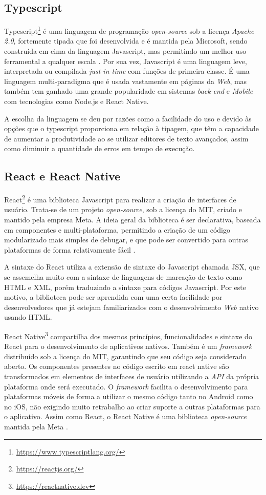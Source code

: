 \subsection{Typescript}

Typescript\footnote{\url{https://www.typescriptlang.org/}} é uma linguagem de programação \textit{open-source} sob a licença \textit{Apache 2.0}, fortemente tipada que foi desenvolvida e é mantida pela Microsoft, sendo construída em cima da linguagem Javascript, mas permitindo um melhor uso ferramental a qualquer escala \cite{typescript}. Por sua vez, Javascript \cite{javascript} é uma linguagem leve, interpretada ou compilada \textit{just-in-time} com funções de primeira classe. É uma linguagem multi-paradigma que é usada vastamente em páginas da \textit{Web}, mas também tem ganhado uma grande popularidade em sistemas \textit{back-end} e \textit{Mobile} com tecnologias como Node.js e React Native.

A escolha da linguagem se deu por razões como a facilidade do uso e devido às opções que o typescript proporciona em relação à tipagem, que têm a capacidade de aumentar a produtividade ao se utilizar editores de texto avançados, assim como diminuir a quantidade de erros em tempo de execução.

\subsection{React e React Native}
\label{react-section}

React\footnote{\url{https://reactjs.org/}} é uma biblioteca Javascript para realizar a criação de interfaces de usuário. Trata-se de um projeto \textit{open-source}, sob a licença do MIT, criado e mantido pela empresa Meta. A ideia geral da biblioteca é ser declarativa, baseada em componentes e multi-plataforma, permitindo a criação de um código modularizado mais simples de debugar, e que pode ser convertido para outras plataformas de forma relativamente fácil \cite{react}.

A sintaxe do React utiliza a extensão de sintaxe do Javascript chamada JSX, que se assemelha muito com a sintaxe de linguagens de marcação de texto como HTML e XML, porém traduzindo a sintaxe para códigos Javascript. Por este motivo, a biblioteca pode ser aprendida com uma certa facilidade por desenvolvedores que já estejam familiarizados com o desenvolvimento \textit{Web} nativo usando HTML.

React Native\footnote{\url{https://reactnative.dev}} compartilha dos mesmos princípios, funcionalidades e sintaxe do React para o desenvolvimento de aplicativos nativos. Também é um \textit{framework} distribuído sob a licença do MIT, garantindo que seu código seja considerado aberto. Os componentes presentes no código escrito em react native são transformados em elementos de interfaces de usuário utilizando a \textit{API} da própria plataforma onde será executado. O \textit{framework} facilita o desenvolvimento para plataformas móveis de forma a utilizar o mesmo código tanto no Android como no iOS, não exigindo muito retrabalho ao criar suporte a outras plataformas para o aplicativo. Assim como React, o React Native é uma biblioteca \textit{open-source} mantida pela Meta \cite{react-native}.

